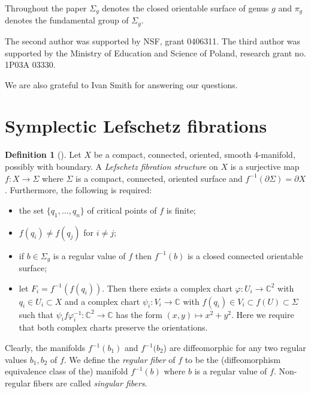 \documentclass[12pt]{amsart}
\newcommand{\B}[1]{{\mathbb #1}}
\theoremstyle{definition}
\newtheorem{df}[subsection]{Definition}
\theoremstyle{remark}
\numberwithin{figure}{section}
\numberwithin{table}{section}
\numberwithin{equation}{section}
\def\m{\medskip}
\newcommand{\Si}{{\Sigma}}
\newcommand{\gf}{\varphi}
\begin{document}
\m
Throughout the paper $\Sigma_g$ denotes the closed orientable surface of genus $g$ and 
$\pi_g$ denotes the fundamental group of $\Sigma_g$.


\m {\bf Acknowledgments:} The second author was supported by NSF,
grant 0406311. The third author was supported by the Ministry of Education
and Science of Poland, research grant
no. 1P03A 03330.

We are also grateful to Ivan Smith for answering our questions.










\section{Symplectic Lefschetz fibrations}\label{s:slf} 




\begin{df}[\cite{ABKP, D1, GS}] Let $X$ be a compact, connected, oriented, 
smooth 4-manifold, possibly with boundary. A {\em Lefschetz fibration structure} on $X$ is 
a surjective map $f: X \to \Si$ where $\Si$ is a compact, connected, oriented surface and 
$f^{-1}(\partial \Si)=\partial X$. Furthermore, the following is required:

%

\begin{itemize}
\item the set $\{q_1, \ldots, q_n\}$ of critical 
points of $f$ is finite;
\item $f(q_i)\neq f(q_j)$ for $i\neq j$; 
\item if $b\in \Si_{g}$ is a regular value of $f$ then $f^{-1}(b)$ is a closed 
connected orientable surface;
\item let $F_i=f^{-1}(f(q_i))$.  Then there exists a complex chart $\gf: U_i\to  
\B C^2$ with $q_i\in U_i\subset X$ and a complex chart $\psi_i:V_i\to \B C$ with 
$f(q_i)\in V_i \subset f(U)\subset  \Si$ such that $\psi_if\gf_i^{-1}: \B C^2 \to 
\B C$ has the form  $(x,y) \mapsto x^2+y^2$.
Here we require that both complex charts preserve the orientations.
\end{itemize}
\end{df}


 
Clearly, the manifolds $f^{-1}(b_1)$ and $f^{-1}(b_2$) are diffeomorphic for any 
two regular values $b_1, b_2$ of $f$. We define the {\it regular fiber} of $f$ to 
be the (diffeomorphism equivalence class of the) manifold $f^{-1}(b)$ where $b$ 
is a regular value of $f$. Non-regular fibers are called {\it singular fibers}.
\end{document}
